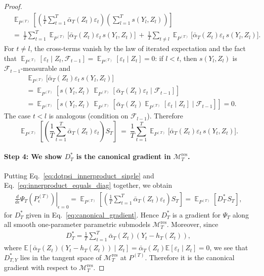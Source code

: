 \documentclass[11pt]{article}
\DeclareMathOperator{\E}{\mathbb{E}}
\begin{document}
\begin{proof}
\begin{align*}
    &\E_{P^{(T)}}\!\left[\left(\frac{1}{T}\sum_{t=1}^T \bar\alpha_T(Z_t)\varepsilon_t\right)
\left(\sum_{l=1}^T s(Y_l,Z_l)\right)
\right]\ \\&=\ \frac{1}{T}\sum_{t=1}^T \E_{P^{(T)}}\!\big[\bar\alpha_T(Z_t)\varepsilon_t\,s(Y_t,Z_t)\big]\ +\ \frac{1}{T}\sum_{t\neq l}\E_{P^{(T)}}\!\big[\bar\alpha_T(Z_t)\varepsilon_t\,s(Y_l,Z_l)\big].
\end{align*}
For $t\neq l$, the cross-terms vanish by the law of iterated expectation and the fact that
$\E_{P^{(T)}}[\varepsilon_t\mid Z_t,\mathcal F_{t-1}]=\E_{P^{(T)}}[\varepsilon_t\mid Z_t]=0$:
if $l<t$, then $s(Y_l,Z_l)$ is $\mathcal F_{t-1}$-measurable and
\begin{align*}
    &\E_{P^{(T)}}\!\big[\bar\alpha_T(Z_t)\varepsilon_t\,s(Y_l,Z_l)\big]\\
    &= \E_{P^{(T)}}\!\left[s(Y_l,Z_l)\,\E_{P^{(T)}}[\bar\alpha_T(Z_t)\varepsilon_t\mid \mathcal F_{t-1}]\right]\\
    &= \E_{P^{(T)}}\!\left[s(Y_l,Z_l)\,\E_{P^{(T)}}[\bar\alpha_T(Z_t)\E_{P^{(T)}}[\varepsilon_t\mid Z_t]\mid \mathcal F_{t-1}]\right]
=0.
\end{align*}
The case $t<l$ is analogous (condition on $\mathcal F_{l-1}$).
Therefore
\begin{equation}
\label{eq:innerproduct_equals_diag}
\E_{P^{(T)}}\!\left[\left(\frac{1}{T}\sum_{t=1}^T\bar\alpha_T(Z_t)\varepsilon_t\right)S_T\right]
\ =\ 
\frac{1}{T}\sum_{t=1}^T \E_{P^{(T)}}\!\big[\bar\alpha_T(Z_t)\varepsilon_t\,s(Y_t,Z_t)\big].
\end{equation}

\paragraph{Step 4: We show $D^{\ast}_{T}$ is the canonical gradient in $\mathcal{M}_T^{\mathrm{res}}$. }
Putting Eq.~\eqref{eq:dotpsi_innerproduct_single} and Eq.~\eqref{eq:innerproduct_equals_diag} together, we obtain 
\begin{align*}
    \left.\frac{d}{d\epsilon}\Psi_T(P^{(T)}_\epsilon)\right|_{\epsilon=0} = \E_{P^{(T)}}\!\left[\left(\frac{1}{T}\sum_{t=1}^T\bar\alpha_T(Z_t)\varepsilon_t\right)S_T\right] = \E_{P^{(T)}}\!\left[D^{\ast}_{T}\,S_T\right],
\end{align*}
for $D^{\ast}_{T}$ given in Eq.~\eqref{eq:canonical_gradient}. Hence $D^{\ast}_{T}$ is a gradient for $\Psi_T$
along all smooth one-parameter parametric submodels $\mathcal{M}_T^{\mathrm{res}}$. 
Moreover, since 
\begin{align*}
    D^{\ast}_{T} = \frac{1}{T}\sum_{t=1}^{T}\bar{\alpha}_T(Z_t)(Y_t - h_T(Z_t)),
\end{align*}
where $\mathbb{E}[\bar{\alpha}_T(Z_t)(Y_t - h_T(Z_t)) \mid Z_t] = \bar{\alpha}_T(Z_t)\mathbb{E}[\varepsilon_t \mid Z_t] = 0$, we see that $D^{\ast}_{T,Y}$ lies in the tangent space of $\mathcal{M}_T^{\mathrm{res}}$ at $P^{(T)}$. Therefore it is the canonical gradient with respect to $\mathcal{M}_T^{\mathrm{res}}$. 


\end{proof}
\end{document}
